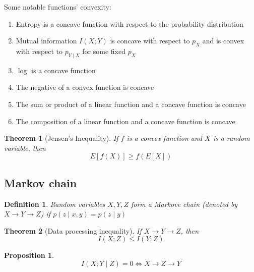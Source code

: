 \documentclass{article}
\newtheorem{definition}{Definition}[section]
\newtheorem{theorem}{Theorem}[section]
\newtheorem{proposition}{Proposition}[section]
\begin{document}
    Some notable functions' convexity:
    \begin{enumerate}
        \item Entropy is a concave function with respect to the probability distribution
        \item Mutual information $I(X; Y)$ is concave with respect to $p_X$ and is convex with respect to $p_{Y \mid X}$ for some fixed $p_X$
        \item $\log$ is a concave function
        \item The negative of a convex function is concave
        \item The sum or product of a linear function and a concave function is concave
        \item The composition of a linear function and a concave function is concave
    \end{enumerate}

    \begin{theorem}[Jensen's Inequality]
        If $f$ is a convex function and $X$ is a random variable, then
        \begin{equation*}
            E[f(X)] \geq f(E[X])
        \end{equation*}
    \end{theorem}

    \subsection{Markov chain}
    \begin{definition}
        Random variables $X, Y, Z$ form a Markove chain (denoted by $X \rightarrow Y \rightarrow Z$) if $p(z \mid x, y) = p(z \mid y)$
    \end{definition}

    \begin{theorem}[Data processing inequality]
        If $X \rightarrow Y \rightarrow Z$, then
        \begin{equation*}
            I(X; Z) \leq I(Y; Z)
        \end{equation*}
    \end{theorem}

    \begin{proposition}
        \begin{equation*}
            I(X; Y \mid Z) = 0 \Leftrightarrow X \rightarrow Z \rightarrow Y
        \end{equation*}
    \end{proposition}
\end{document}
